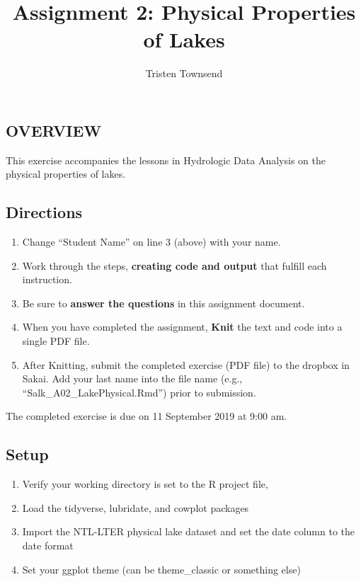 \documentclass[]{article}
\title{Assignment 2: Physical Properties of Lakes}
\author{Tristen Townsend}
\date{}
\providecommand{\tightlist}{%
  \setlength{\itemsep}{0pt}\setlength{\parskip}{0pt}}
\begin{document}
\maketitle

\hypertarget{overview}{%
\subsection{OVERVIEW}\label{overview}}

This exercise accompanies the lessons in Hydrologic Data Analysis on the
physical properties of lakes.

\hypertarget{directions}{%
\subsection{Directions}\label{directions}}

\begin{enumerate}
\def\labelenumi{\arabic{enumi}.}
\tightlist
\item
  Change ``Student Name'' on line 3 (above) with your name.
\item
  Work through the steps, \textbf{creating code and output} that fulfill
  each instruction.
\item
  Be sure to \textbf{answer the questions} in this assignment document.
\item
  When you have completed the assignment, \textbf{Knit} the text and
  code into a single PDF file.
\item
  After Knitting, submit the completed exercise (PDF file) to the
  dropbox in Sakai. Add your last name into the file name (e.g.,
  ``Salk\_A02\_LakePhysical.Rmd'') prior to submission.
\end{enumerate}

The completed exercise is due on 11 September 2019 at 9:00 am.

\hypertarget{setup}{%
\subsection{Setup}\label{setup}}

\begin{enumerate}
\def\labelenumi{\arabic{enumi}.}
\tightlist
\item
  Verify your working directory is set to the R project file,
\item
  Load the tidyverse, lubridate, and cowplot packages
\item
  Import the NTL-LTER physical lake dataset and set the date column to
  the date format
\item
  Set your ggplot theme (can be theme\_classic or something else)
\end{enumerate}
\end{document}
